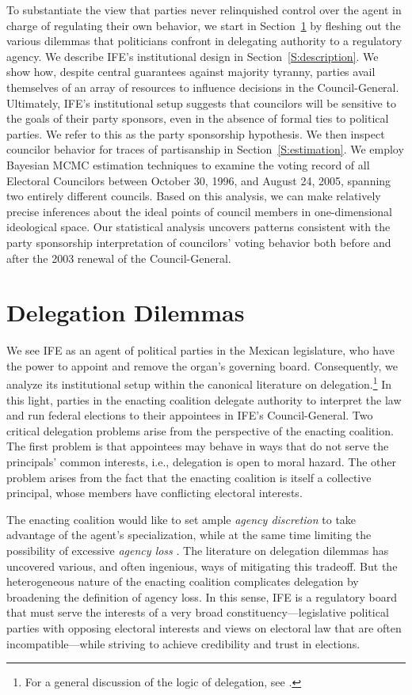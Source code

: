 \documentclass[12 pt, letter]{article}
\begin{document}
To substantiate the view that parties never relinquished control
over the agent in charge of regulating their own behavior, we start
in Section~\ref{S:delegation} by fleshing out the various dilemmas
that politicians confront in delegating authority to a regulatory
agency. We describe IFE's institutional design in
Section~\ref{S:description}.  We show how, despite central
guarantees against majority tyranny, parties avail themselves of an
array of resources to influence decisions in the Council-General.
Ultimately, IFE's institutional setup suggests that councilors will
be sensitive to the goals of their party sponsors, even in the
absence of formal ties to political parties.  We refer to this as
the party sponsorship hypothesis.  We then inspect councilor
behavior for traces of partisanship in Section~\ref{S:estimation}.
We employ Bayesian MCMC estimation techniques to examine the voting
record of all Electoral Councilors between October 30, 1996, and
August 24, 2005, spanning two entirely different councils.  Based on
this analysis, we can make relatively precise inferences about the
ideal points of council members in one-dimensional ideological
space.  Our statistical analysis uncovers patterns consistent with
the party sponsorship interpretation of councilors' voting behavior
both before and after the 2003 renewal of the Council-General.

\section{Delegation Dilemmas}\label{S:delegation}
We see IFE as an agent of political parties in the Mexican
legislature, who have the power to appoint and remove the organ's
governing board. Consequently, we analyze its institutional setup
within the canonical literature on delegation.\footnote{For a
general discussion of the logic of delegation, see
\citet[22-38]{Kiewiet1991}.}  In this light, parties in the enacting
coalition delegate authority to interpret the law and run federal
elections to their appointees in IFE's Council-General.  Two
critical delegation problems arise from the perspective of the
enacting coalition.   The first problem is that appointees may
behave in ways that do not serve the principals' common interests,
i.e., delegation is open to moral hazard. The other problem arises
from the fact that the enacting coalition is itself a collective
principal, whose members have conflicting electoral interests.

The enacting coalition would like to set ample \emph{agency
discretion} to take advantage of the agent's specialization, while
at the same time limiting the possibility of excessive \emph{agency
loss} \citep{Madison1788, Epstein1999, Huber2002, Miller2005}.  The
literature on delegation dilemmas has uncovered various, and often
ingenious, ways of mitigating this tradeoff.  But the heterogeneous
nature of the enacting coalition complicates delegation by
broadening the definition of agency loss.  In this sense, IFE is a
regulatory board that must serve the interests of a very broad
constituency---legislative political parties with opposing electoral
interests and views on electoral law that are often
incompatible---while striving to  achieve credibility and trust in
elections.
\end{document}
